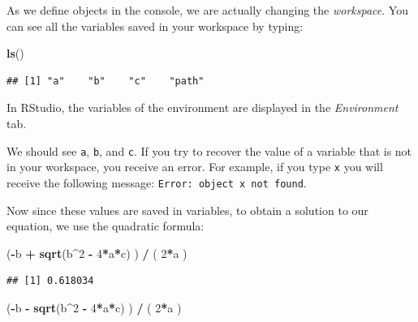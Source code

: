 \documentclass[
]{article}
\newenvironment{Shaded}{\begin{snugshade}}{\end{snugshade}}
\newcommand{\DecValTok}[1]{\textcolor[rgb]{0.00,0.00,0.81}{#1}}
\newcommand{\FunctionTok}[1]{\textcolor[rgb]{0.13,0.29,0.53}{\textbf{#1}}}
\newcommand{\NormalTok}[1]{#1}
\newcommand{\SpecialCharTok}[1]{\textcolor[rgb]{0.81,0.36,0.00}{\textbf{#1}}}
\begin{document}
As we define objects in the console, we are actually changing the
\emph{workspace}. You can see all the variables saved in your workspace
by typing:

\begin{Shaded}
\begin{Highlighting}[]
\FunctionTok{ls}\NormalTok{()}
\end{Highlighting}
\end{Shaded}

\begin{verbatim}
## [1] "a"    "b"    "c"    "path"
\end{verbatim}

In RStudio, the variables of the environment are displayed in the
\emph{Environment} tab.

We should see \texttt{a}, \texttt{b}, and \texttt{c}. If you try to
recover the value of a variable that is not in your workspace, you
receive an error. For example, if you type \texttt{x} you will receive
the following message:
\texttt{Error:\ object\ \textquotesingle{}x\textquotesingle{}\ not\ found}.

Now since these values are saved in variables, to obtain a solution to
our equation, we use the quadratic formula:

\begin{Shaded}
\begin{Highlighting}[]
\NormalTok{(}\SpecialCharTok{{-}}\NormalTok{b }\SpecialCharTok{+} \FunctionTok{sqrt}\NormalTok{(b}\SpecialCharTok{\^{}}\DecValTok{2} \SpecialCharTok{{-}} \DecValTok{4}\SpecialCharTok{*}\NormalTok{a}\SpecialCharTok{*}\NormalTok{c) ) }\SpecialCharTok{/}\NormalTok{ ( }\DecValTok{2}\SpecialCharTok{*}\NormalTok{a )}
\end{Highlighting}
\end{Shaded}

\begin{verbatim}
## [1] 0.618034
\end{verbatim}

\begin{Shaded}
\begin{Highlighting}[]
\NormalTok{(}\SpecialCharTok{{-}}\NormalTok{b }\SpecialCharTok{{-}} \FunctionTok{sqrt}\NormalTok{(b}\SpecialCharTok{\^{}}\DecValTok{2} \SpecialCharTok{{-}} \DecValTok{4}\SpecialCharTok{*}\NormalTok{a}\SpecialCharTok{*}\NormalTok{c) ) }\SpecialCharTok{/}\NormalTok{ ( }\DecValTok{2}\SpecialCharTok{*}\NormalTok{a )}
\end{Highlighting}
\end{Shaded}
\end{document}
